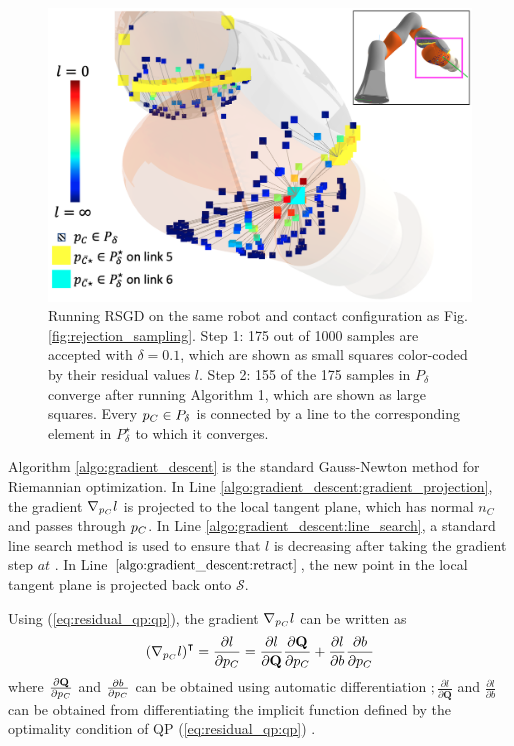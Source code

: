 \begin{figure}[h]
\centering
\includegraphics[width=0.9\linewidth]{figures/05_force_from_torque/rsgd.png}
\caption{Running RSGD on the same robot and contact configuration as Fig. \ref{fig:rejection_sampling}. Step 1: 175 out of 1000 samples are accepted with $\delta = 0.1$, which are shown as small squares color-coded by their residual values $l$. Step 2: 155 of the 175 samples in $P_\delta$ converge after running Algorithm 1, which are shown as large squares. Every $p_{C} \in P_\delta$ is connected by a line to the corresponding element in $P_\delta^\star$ to which it converges.}
\label{fig:rsgd}
\end{figure}

Algorithm \ref{algo:gradient_descent} is the standard Gauss-Newton method for Riemannian optimization. In Line \ref{algo:gradient_descent:gradient_projection}, the gradient $\nabla_{p_{C}} l$ is projected to the local tangent plane, which has normal ${n}_C$ and passes through $p_{C}$. In Line \ref{algo:gradient_descent:line_search}, a standard line search method is used to ensure that $l$ is decreasing after taking the gradient step $a{t}$ \cite{boyd2004convex}. In Line $\ref{algo:gradient_descent:retract}$, the new point in the local tangent plane is projected back onto $\mathcal{S}$.

Using (\ref{eq:residual_qp:qp}), the gradient $\nabla_{p_{C}} l$ can be written as 
\begin{equation}
\label{eq:l_gradient_chain_rule}
\left(\nabla_{p_{C}} l \right)^\intercal =
\frac{\partial l}{\partial p_{C}} = \frac{\partial l}{\partial \mathbf{Q}} \frac{\partial \mathbf{Q}}{\partial p_{C}} + \frac{\partial l}{\partial {b}} \frac{\partial {b}}{\partial p_{C}}
\end{equation}
where $\frac{\partial \mathbf{Q}}{\partial p_{C}}$ and $\frac{\partial {b}}{\partial p_{C}}$ can be obtained using automatic differentiation \cite{griewank1989automatic}$; \frac{\partial l}{\partial \mathbf{Q}}$ and $\frac{\partial l}{\partial {b}}$ can be obtained from differentiating the implicit function defined by the optimality condition of QP (\ref{eq:residual_qp:qp}) \cite{boot1963sensitivity}.

